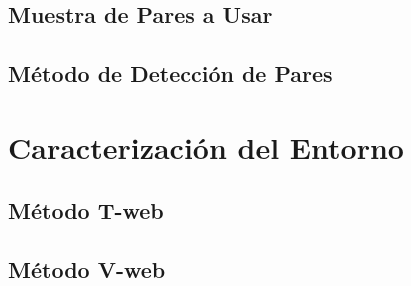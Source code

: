 	
	\subsection{Muestra de Pares a Usar}
	\label{subsec:SampleOfPairsToUse}
	
	
	\subsection{Método de Detección de Pares}
	\label{subsec:PairFinderMethod}






\section{Caracterización del Entorno}
\label{sec:EnvironmentCharacterization}


	\subsection{Método T-web}
	\label{subsec:TheT-webMethod}


	\subsection{Método V-web}
	\label{subsec:TheV-webMethod}




